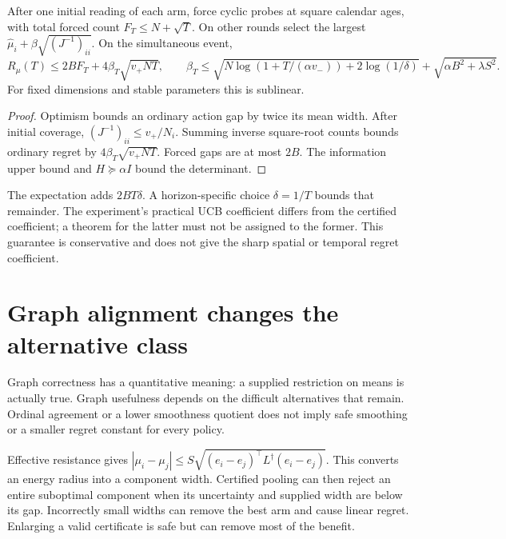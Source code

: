 \begin{theorem}
After one initial reading of each arm, force cyclic probes at square calendar ages, with total forced count $F_T\le N+\sqrt T$. On other rounds select the largest $\widehat\mu_i+\beta\sqrt{(J^{-1})_{ii}}$. On the simultaneous event,
\begin{equation}
R_\mu(T)\le2BF_T+4\beta_T\sqrt{v_+NT},
\qquad
\beta_T\le\sqrt{N\log(1+T/(\alpha v_-))+2\log(1/\delta)}
+\sqrt{\alpha B^2+\lambda S^2}.
\end{equation}
For fixed dimensions and stable parameters this is sublinear.
\end{theorem}
\begin{proof}
Optimism bounds an ordinary action gap by twice its mean width. After initial coverage, $(J^{-1})_{ii}\le v_+/N_i$. Summing inverse square-root counts bounds ordinary regret by $4\beta_T\sqrt{v_+NT}$. Forced gaps are at most $2B$. The information upper bound and $H\succeq\alpha I$ bound the determinant.
\end{proof}
The expectation adds $2BT\delta$. A horizon-specific choice $\delta=1/T$ bounds that remainder. The experiment's practical UCB coefficient differs from the certified coefficient; a theorem for the latter must not be assigned to the former. This guarantee is conservative and does not give the sharp spatial or temporal regret coefficient.

\section{Graph alignment changes the alternative class}

Graph correctness has a quantitative meaning: a supplied restriction on means is actually true. Graph usefulness depends on the difficult alternatives that remain. Ordinal agreement or a lower smoothness quotient does not imply safe smoothing or a smaller regret constant for every policy.

Effective resistance gives
$|\mu_i-\mu_j|\le S\sqrt{(e_i-e_j)^\top L^\dagger(e_i-e_j)}$. This converts an energy radius into a component width. Certified pooling can then reject an entire suboptimal component when its uncertainty and supplied width are below its gap. Incorrectly small widths can remove the best arm and cause linear regret. Enlarging a valid certificate is safe but can remove most of the benefit.

